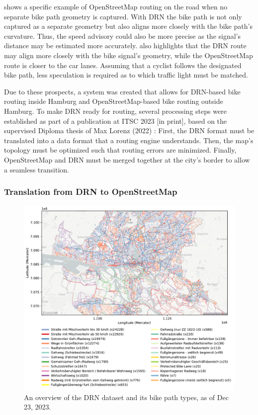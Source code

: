  shows a specific example of OpenStreetMap routing on the road when no separate bike path geometry is captured. With DRN the bike path is not only captured as a separate geometry but also aligns more closely with the bike path's curvature. Thus, the speed advisory could also be more precise as the signal's distance may be estimated more accurately.  also highlights that the DRN route may align more closely with the bike signal's geometry, while the OpenStreetMap route is closer to the car lanes. Assuming that a cyclist follows the designated bike path, less speculation is required as to which traffic light must be matched. 

Due to these prospects, a system was created that allows for DRN-based bike routing inside Hamburg and OpenStreetMap-based bike routing outside Hamburg. To make DRN ready for routing, several processing steps were established as part of a publication at ITSC 2023 [in print], based on the supervised Diploma thesis of Max Lorenz (2022) \cite{lorenz_2022}: First, the DRN format must be translated into a data format that a routing engine understands. Then, the map's topology must be optimized such that routing errors are minimized. Finally, OpenStreetMap and DRN must be merged together at the city's border to allow a seamless transition.

\subsubsection{Translation from DRN to OpenStreetMap}

\begin{figure}[htbp]
\centering
\includegraphics[width=\linewidth]{images/routing-drn.pdf}
\caption{An overview of the DRN dataset and its bike path types, as of Dec 23, 2023.}
\label{fig:drn-map}
\end{figure}


